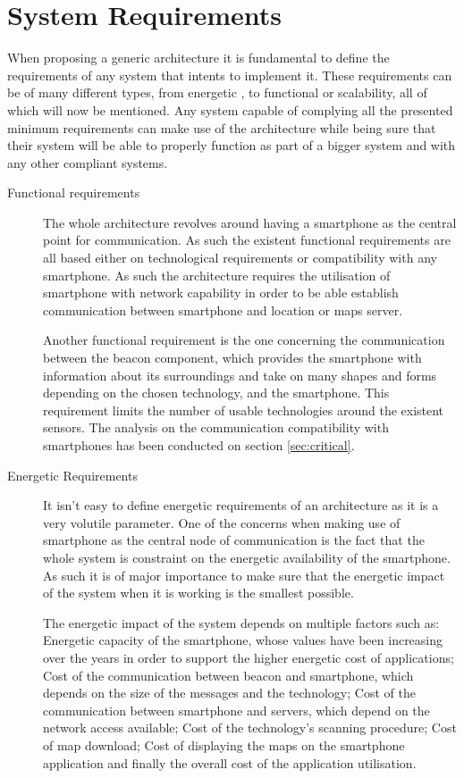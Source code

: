 \section{System Requirements}
\label{sec:requirements}

When proposing a generic architecture it is fundamental to define the requirements of any system that intents to implement it. These requirements can be of many different types, from energetic , to functional or scalability, all of which will now be mentioned. Any system capable of complying all the presented minimum requirements can make use of the architecture while being sure that their system will be able to properly function as part of a bigger system and with any other compliant systems. 



\begin{description}
\item [Functional requirements] The whole architecture revolves around having a smartphone as the central point for communication. As such the existent functional requirements are all based either on technological requirements  or compatibility with any smartphone. As such the architecture requires the utilisation of smartphone with network capability in order to be able establish communication between smartphone and location or maps server.

Another functional requirement is the one concerning the communication between the beacon component, which provides the smartphone with information about its surroundings and take on many shapes and forms depending on the chosen technology, and the smartphone. This requirement limits the number of usable technologies around the existent sensors. The analysis on the communication compatibility with smartphones has been conducted on section \ref{sec:critical}.

\item [Energetic Requirements] It isn't easy to define energetic requirements of an architecture as it is a very volutile parameter. One of the concerns when making use of smartphone as the central node of communication is the fact that the whole system is constraint on the energetic availability of the smartphone. As such it is of major importance to make sure that the energetic impact of the system when it is working is the smallest possible.

The energetic impact of the system depends on multiple factors such as: Energetic capacity of the smartphone, whose values have been increasing over the years in order to support the higher energetic cost of applications; Cost of the communication between beacon and smartphone, which depends on the size of the messages and the technology; Cost of the communication between smartphone and servers, which depend on the network access available; Cost of the technology's scanning procedure; Cost of map download; Cost of displaying the maps on the smartphone application and finally the overall cost of the application utilisation.


\end{description}
